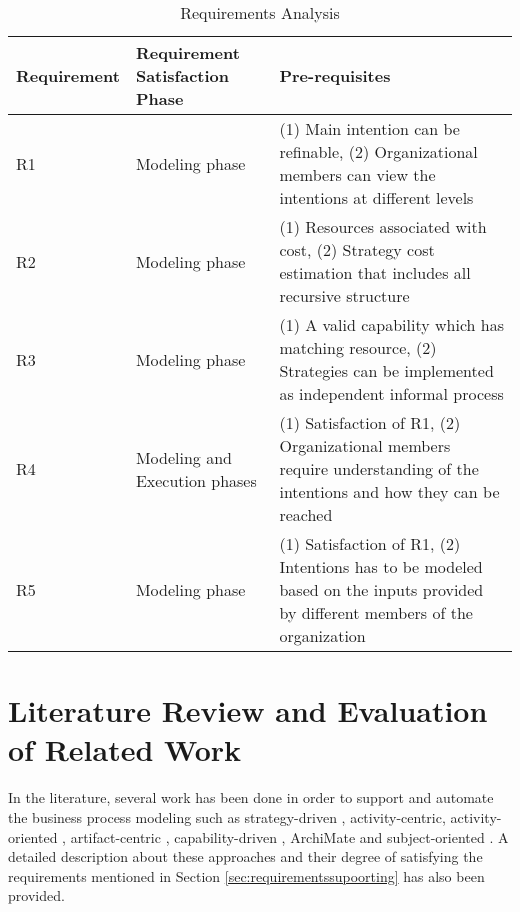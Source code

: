 \begin{table} [htbp]
	\centering
	\begin{tabular} {p{2.5cm}p{3cm}p{8cm}}
		\toprule
		\textbf{Requirement} & \textbf{Requirement Satisfaction Phase} & \textbf{Pre-requisites}    \\
		\midrule                                                                                                               
		R1    & Modeling phase    &(1) Main intention can be refinable, (2) Organizational members can view the intentions at different levels    \\ 
		
		R2   & Modeling phase    &(1) Resources associated with cost, (2) Strategy cost estimation that includes all recursive structure \\         
			
		R3   & Modeling phase       &(1) A valid capability which has matching resource, (2) Strategies can be implemented as independent informal process \\      
		
		R4   & Modeling and Execution phases     &(1) Satisfaction of R1, (2) Organizational members require understanding of the intentions and how they can be reached \\                         
			
		R5  &Modeling phase  &(1) Satisfaction of R1, (2) Intentions has to be modeled based on the inputs provided by different members of the organization               \\ 
		    
		\bottomrule
	\end{tabular}
	\caption{Requirements Analysis}
	\label{tab:subrequirements}
\end{table}

\section{Literature Review and Evaluation of Related Work}
\label{sec:literaturereview}
In the literature, several work has been done in order to support and automate the business process modeling such as strategy-driven \cite{Bider2005}, activity-centric\cite{Yarosh2009}, activity-oriented \cite{Leymann2000}, artifact-centric \cite{Cohn2009}, capability-driven \cite{Stirna2012}, ArchiMate \cite{Group2012} and subject-oriented \cite{Fleischmann2013}.  A detailed description about these approaches and their degree of satisfying the requirements mentioned in Section \ref{sec:requirementssupoorting} has also been provided. 

